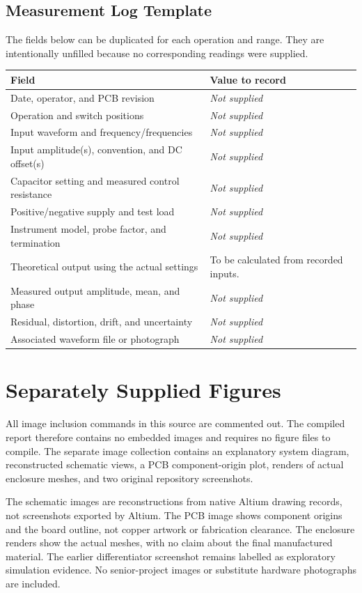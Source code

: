 \documentclass[11pt,a4paper]{article}
\newcommand{\notrecorded}{\textit{Not supplied}}
\begin{document}
\subsection{Measurement Log Template}
The fields below can be duplicated for each operation and range. They are intentionally unfilled because no corresponding readings were supplied.
\begin{table}[H]
\centering\small
\begin{tabularx}{\textwidth}{P{0.42\textwidth}Y}
\toprule\textbf{Field} & \textbf{Value to record}\\\midrule
Date, operator, and PCB revision & \notrecorded\\
Operation and switch positions & \notrecorded\\
Input waveform and frequency/frequencies & \notrecorded\\
Input amplitude(s), convention, and DC offset(s) & \notrecorded\\
Capacitor setting and measured control resistance & \notrecorded\\
Positive/negative supply and test load & \notrecorded\\
Instrument model, probe factor, and termination & \notrecorded\\
Theoretical output using the actual settings & To be calculated from recorded inputs.\\
Measured output amplitude, mean, and phase & \notrecorded\\
Residual, distortion, drift, and uncertainty & \notrecorded\\
Associated waveform file or photograph & \notrecorded\\
\bottomrule
\end{tabularx}
\end{table}

\section{Separately Supplied Figures}
All image inclusion commands in this source are commented out. The compiled report therefore contains no embedded images and requires no figure files to compile. The separate image collection contains an explanatory system diagram, reconstructed schematic views, a PCB component-origin plot, renders of actual enclosure meshes, and two original repository screenshots.

The schematic images are reconstructions from native Altium drawing records, not screenshots exported by Altium. The PCB image shows component origins and the board outline, not copper artwork or fabrication clearance. The enclosure renders show the actual meshes, with no claim about the final manufactured material. The earlier differentiator screenshot remains labelled as exploratory simulation evidence. No senior-project images or substitute hardware photographs are included.

\end{document}
